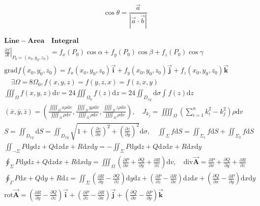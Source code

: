 \documentclass{article}
\begin{document}
\begin{displaymath}
    \cos \theta = \frac{\vec{a}}{|\vec{a} \cdot \vec{b}|}
\end{displaymath}

\clearpage 

\begin{align*}
    \bm{Line-Area \quad Integral} \\ 
    \left. \frac{\partial f}{\partial l}\right|_{P_{0}=(x_{0},y_{0},z_{0})} = f_{x}(P_{0})\cos \alpha + f_{y}(P_{0})\cos \beta + f_{z}(P_{0})\cos \gamma\\
    \bm{\mathrm{grad}}f(x_{0},y_{0},z_{0}) = f_{x}(x_{0},y_{0},z_{0})\bm{\vec{i}} + f_{y}(x_{0},y_{0},z_{0})\bm{\vec{j}} + f_{z}(x_{0},y_{0},z_{0})\bm{\vec{k}} \\ 
    \quad \exists \varOmega = 8\varOmega_{0},f(x,y,z) = f(y,z,x) = f(z,x,y) \\  
    \iiint_{\varOmega} f(x,y,z) \mathrm{d}v = 24 \iiint_{\varOmega_{0}}f(z) \mathrm{d}z = 24\iint_{D_{xy}}\mathrm{d}\sigma\int_{}f(z)\mathrm{d}z \\ 
    (\bar{x},\bar{y},\bar{z}) = (\frac{\iiiint_{\Omega}x\rho \mathrm{d}v}{\iiiint_{\Omega}\rho \mathrm{d}v},\frac{\iiiint_{\Omega}y\rho \mathrm{d}v}{\iiiint_{\Omega}\rho \mathrm{d}v},\frac{\iiiint_{\Omega}z\rho \mathrm{d}v}{\iiiint_{\Omega}\rho \mathrm{d}v}), \quad J_{k_{j}} = \iiiint_{\Omega}(\sum_{i=1}^n{k_{i}^2}-k^2_{j})\rho\mathrm{d}v\\
    S = \iint_{D_{xy}}\mathrm{d}S = \iint_{D_{xy}}\sqrt{1+(\frac{\partial z}{\partial x})^2+(\frac{\partial z}{\partial y})^2}\mathrm{d}\sigma ,\quad \iint_{\Sigma}f \mathrm{d}S = \iint_{\Sigma_{1}}f\mathrm{d}S +  \iint_{\Sigma_{2}}f\mathrm{d}S \\ 
    \iint_{-\Sigma}P\mathrm{d}y\mathrm{d}z+Q\mathrm{d}z\mathrm{d}x+R\mathrm{d}x\mathrm{d}y = -\iint_{\Sigma}P\mathrm{d}y\mathrm{d}z+Q\mathrm{d}z\mathrm{d}x+R\mathrm{d}x\mathrm{d}y \\  
    \oint_{\Sigma}P\mathrm{d}y\mathrm{d}z+Q\mathrm{d}z\mathrm{d}x+R\mathrm{d}x\mathrm{d}y = \iiint_{\Omega} (\frac{\partial P}{\partial x}+{\frac{\partial Q}{\partial y}}+{\frac{\partial R}{\partial z}}) \mathrm{d}v ,\quad \mathrm{div}\bm{\vec{A}} = \frac{\partial P}{\partial x}+{\frac{\partial Q}{\partial y}}+{\frac{\partial R}{\partial z}} \\
    \oint_{\Gamma}P\mathrm{d}x+Q\mathrm{d}y +R\mathrm{d}z = \iint_{\Sigma}(\frac{\partial R}{\partial y}-\frac{\partial Q}{\partial z})\mathrm{d}y\mathrm{d}z+(\frac{\partial P}{\partial z}-\frac{\partial R}{\partial x})\mathrm{d}z\mathrm{d}x+(\frac{\partial Q}{\partial x}-\frac{\partial P}{\partial y})\mathrm{d}x\mathrm{d}y \\
    \bm{\mathrm{rot}\vec{A}} = (\frac{\partial R}{\partial y}-\frac{\partial Q}{\partial z})\bm{\vec{i}}+(\frac{\partial P}{\partial z}-\frac{\partial R}{\partial x})\bm{\vec{j}}+(\frac{\partial Q}{\partial x}-\frac{\partial P}{\partial y})\bm{\vec{k}}\\
\end{align*}
\end{document}
